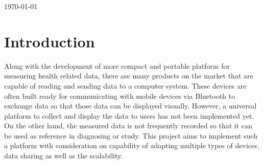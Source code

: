 \begin{titlepage}


{\large \today}\\[2cm] %



\vfill %
\end{titlepage}

\linespread{1.25}

\section{Introduction}
Along with the development of more compact and portable platform for measuring health related data, there are many
products on the market that are capable of reading and sending data to a computer system. These devices are often built
ready for communicating with mobile devices via Bluetooth to exchange data so that those data can be displayed visually.
However, a universal platform to collect and display the data to users has not been implemented yet. On the other hand,
the measured data is not frequently recorded so that it can be used as reference in diagnosing or study.  This project
aims to implement such a platform with consideration on capability of adapting multiple types of devices, data sharing
as well as the scalability.

